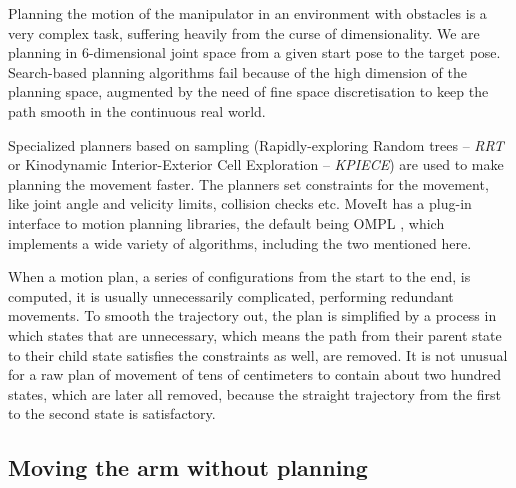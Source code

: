 \documentclass[buriama8_dp.tex]{subfiles}
\begin{document}
Planning the motion of the manipulator in an environment with obstacles is a very complex task, suffering heavily from the curse of dimensionality. We are planning in 6-dimensional joint space from a given start pose to the target pose. Search-based planning algorithms fail because of the high dimension of the planning space, augmented by the need of fine space discretisation to keep the path smooth in the continuous real world.

Specialized planners based on sampling (Rapidly-exploring Random trees -- \emph{RRT} \cite{rrt}  or Kinodynamic Interior-Exterior Cell Exploration -- \emph{KPIECE}) are used to make planning the movement faster. The planners set constraints for the movement, like joint angle and velicity limits, collision checks etc. MoveIt has a plug-in interface to motion planning libraries, the default being OMPL \cite{ompl}, which implements a wide variety of algorithms, including the two mentioned here.



When a motion plan, a series of configurations from the start to the end, is computed, it is usually unnecessarily complicated, performing redundant movements. To smooth the trajectory out, the plan is simplified by a process in which states that are unnecessary, which means the path from their parent state to their child state satisfies the constraints as well, are removed. It is not unusual for a raw plan of movement of tens of centimeters to contain about two hundred states, which are later all removed, because the straight trajectory from the first to the second state is satisfactory.

\subsection{Moving the arm without planning}
\label{subsec:no_plan}
\end{document}
